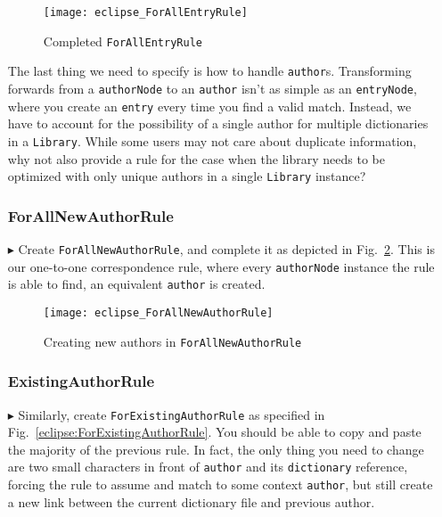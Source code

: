 \begin{itemize}
\begin{figure}[htbp]
\begin{center}
  \texttt{[image: eclipse\_ForAllEntryRule]}
  \caption{Completed \texttt{ForAllEntryRule}}
  \label{eclipse:ForAllEntryRule}
\end{center}
\end{figure}

\newpage


The last thing we need to specify is how to handle \texttt{author}s. Transforming forwards from a \texttt{authorNode} to an \texttt{author} isn't as simple as
an \texttt{entryNode}, where you create an \texttt{entry} every time you find a valid match. Instead, we have to account for the possibility of a single author
for multiple dictionaries in a \texttt{Library}. While some users may not care about duplicate information, why not also provide a rule for the case when the
library needs to be optimized with only unique authors in a single \texttt{Library} instance?

\subsubsection{ForAllNewAuthorRule} %

\item[$\blacktriangleright$] Create \texttt{ForAllNewAuthorRule}, and complete it as depicted in Fig.~\ref{eclipse:ForAllNewAuthorRule}. This is our one-to-one
correspondence rule, where every \texttt{authorNode} instance the rule is able to find, an equivalent \texttt{author} is created.

\begin{figure}[htbp]
\begin{center}
  \texttt{[image: eclipse\_ForAllNewAuthorRule]}
  \caption{Creating new authors in \texttt{ForAllNewAuthorRule}}
  \label{eclipse:ForAllNewAuthorRule}
\end{center}
\end{figure}

\subsubsection{ExistingAuthorRule} %

\item[$\blacktriangleright$] Similarly, create \texttt{ForExistingAuthorRule} as specified in Fig.~\ref{eclipse:ForExistingAuthorRule}. You should be able to
copy and paste the majority of the previous rule. In fact, the only thing you need to change are two small characters in front of \texttt{author} and its
\texttt{dictionary} reference, forcing the rule to assume and match to some context \texttt{author}, but still create a new link between the current dictionary
file and previous author.


\end{itemize}

